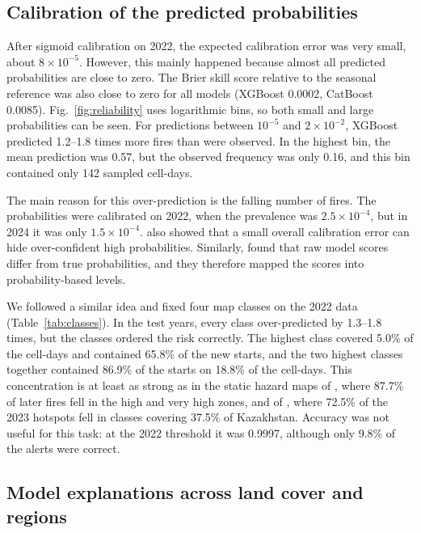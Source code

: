 \subsection{Calibration of the predicted probabilities}\label{sec:res_calibration}

After sigmoid calibration on 2022, the expected calibration error was very small, about $8\times10^{-5}$. However, this mainly happened because almost all predicted probabilities are close to zero. The Brier skill score relative to the seasonal reference was also close to zero for all models (XGBoost 0.0002, CatBoost 0.0085). Fig.~\ref{fig:reliability} uses logarithmic bins, so both small and large probabilities can be seen. For predictions between $10^{-5}$ and $2\times10^{-2}$, XGBoost predicted 1.2--1.8 times more fires than were observed. In the highest bin, the mean prediction was 0.57, but the observed frequency was only 0.16, and this bin contained only 142 sampled cell-days.

The main reason for this over-prediction is the falling number of fires. The probabilities were calibrated on 2022, when the prevalence was $2.5\times10^{-4}$, but in 2024 it was only $1.5\times10^{-4}$. \cite{choi2026burnedarea} also showed that a small overall calibration error can hide over-confident high probabilities. Similarly, \cite{apostolakis2025interpretation} found that raw model scores differ from true probabilities, and they therefore mapped the scores into probability-based levels.

We followed a similar idea and fixed four map classes on the 2022 data (Table~\ref{tab:classes}). In the test years, every class over-predicted by 1.3--1.8 times, but the classes ordered the risk correctly. The highest class covered 5.0\% of the cell-days and contained 65.8\% of the new starts, and the two highest classes together contained 86.9\% of the starts on 18.8\% of the cell-days. This concentration is at least as strong as in the static hazard maps of \cite{bouzeraa2025wsm}, where 87.7\% of later fires fell in the high and very high zones, and of \cite{chepashev2025maxent}, where 72.5\% of the 2023 hotspots fell in classes covering 37.5\% of Kazakhstan. Accuracy was not useful for this task: at the 2022 threshold it was 0.9997, although only 9.8\% of the alerts were correct.

\subsection{Model explanations across land cover and regions}\label{sec:res_shap}

